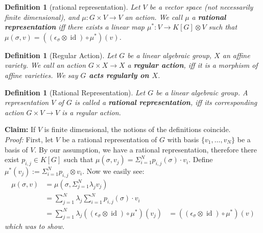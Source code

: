 \message{ !name(roughdraft.tex)}\documentclass{article}
\theoremstyle{prrt}
\newtheorem{definition}[theorem]{Definition}
\begin{document}
\begin{definition}[rational representation]\label{rr}
  Let $V$ be a vector space (not necessarily finite dimensional), and $ \mu : G \times V \longrightarrow V $ an action.
  We call $ \mu $ a \textbf{rational representation} iff there exists a linear map $ \mu^\ast \colon V \longrightarrow K[G] \otimes V $ such that $ \mu \left( \sigma , v \right) = \left( \left( \epsilon_\sigma \otimes \operatorname{id} \right) \circ \mu^\ast \right) \left(v\right) $. 
\end{definition}

\begin{definition}[Regular Action]
  Let $G$ be a linear algebraic group, $X$ an affine variety.
  We call an action $G \times X \longrightarrow X$ a \textbf{regular action}, iff it is a morphism of affine varieties.
  We say \textbf{$ G $ acts regularly on $ X $}.
\end{definition}

\begin{definition}[Rational Representation]
  Let $G$ be a linear algebraic group.
  A representation $V$ of $G$ is called a \textbf{rational representation}, iff its corresponding action $ G \times V \longrightarrow V $ is a regular action.
\end{definition}

\textbf{Claim:} If $V$ is finite dimensional, the notions of the definitions coincide.\\
\textit{Proof:} First, let $V$ be a rational representation of $G$ with basis $\{ v_1 , \ldots , v_N \}$ be a basis of $V$.
By our assumption, we have a rational representation, therefore there exist $p_{i,j} \in K \left\lbrack G \right\rbrack$ such that $\mu\left( \sigma, v_j \right) = \Sigma_{i=1}^{N} p_{i,j}\left(\sigma\right) \cdot v_i$.
Define $\mu^\ast \left( v_j \right) := \Sigma_{i=1}^{N} p_{i,j} \otimes v_i$.
Now we easily see:
\begin{equation}
  \begin{aligned}
    \mu\left(\sigma,v\right)
    &= \mu \left(\sigma, \Sigma_{j=1}^N \lambda_j v_j \right) \\
    &= \sum_{j=1}^N \lambda_j  \sum_{i=1}^N p_{i,j}\left(\sigma\right) \cdot v_i \\
    &= \sum_{j=1}^N \lambda_j \left(\left(\epsilon_\sigma \otimes \operatorname{id} \right) \circ \mu^\ast \right) \left(v_j \right)
    &= \left(\left(\epsilon_\sigma \otimes \operatorname{id} \right) \circ \mu^\ast \right) \left(v \right)
  \end{aligned}
\end{equation}
\textit{which was to show.}
\end{document}
